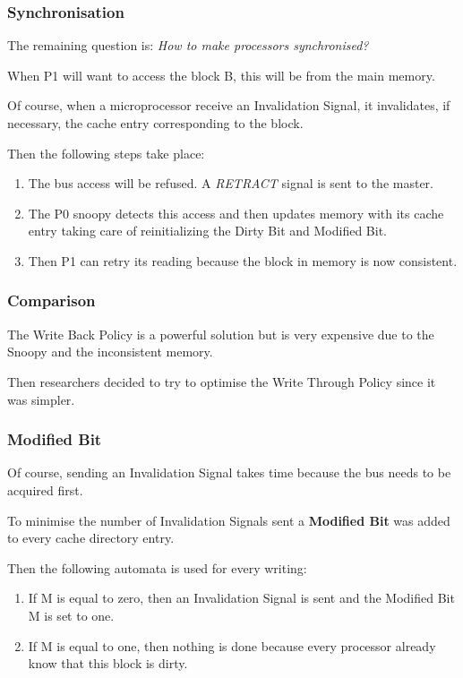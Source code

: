 \begin{frame}
  \frametitle{Synchronisation}

  The remaining question is: \textit{How to make processors synchronised?}

  \-

  When P1 will want to access the block B, this will be from the main memory.

  \-

  Of course, when a microprocessor receive an Invalidation Signal, it
  invalidates, if necessary, the cache entry corresponding to the block.

  \-

  Then the following steps take place:

  \begin{enumerate}
    \item
      The bus access will be refused. A \textit{RETRACT} signal is sent
      to the master.
    \item
      The P0 snoopy detects this access and then updates memory with
      its cache entry taking care of reinitializing the Dirty Bit and Modified
      Bit.
    \item
      Then P1 can retry its reading because the block in memory is now
      consistent.
  \end{enumerate}
\end{frame}


\begin{frame}
  \frametitle{Comparison}

  The Write Back Policy is a powerful solution but is very expensive
  due to the Snoopy and the inconsistent memory.

  \-

  Then researchers decided to try to optimise the Write Through Policy
  since it was simpler.
\end{frame}


\begin{frame}
  \frametitle{Modified Bit}

  Of course, sending an Invalidation Signal takes time because the bus needs
  to be acquired first.

  \-

  To minimise the number of Invalidation Signals sent a \textbf{Modified Bit}
  was added to every cache directory entry.

  \-

  Then the following automata is used for every writing:

  \begin{enumerate}
    \item
      If M is equal to zero, then an Invalidation Signal is sent and the
      Modified Bit M is set to one.
    \item
      If M is equal to one, then nothing is done because every processor
      already know that this block is dirty.
  \end{enumerate}
\end{frame}

